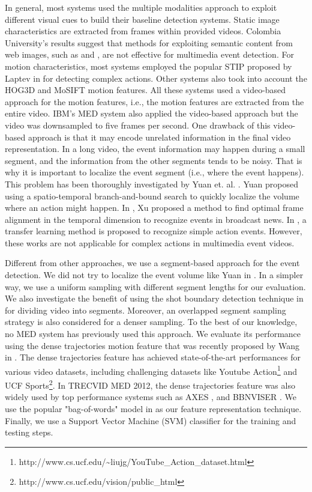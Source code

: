 In general, most systems used the multiple modalities approach to exploit different visual cues to build their baseline detection systems. Static image characteristics are extracted from frames within provided videos. Colombia University's results \cite{trecvid10:cuucf} suggest that methods for exploiting semantic content from web images, such as \cite{duan2012exploiting} and \cite{trecvid10:cuucf}, are not effective for multimedia event detection. For motion characteristics, most systems employed the popular STIP proposed by Laptev in \cite{Laptev:2005:SIP} for detecting complex actions. Other systems also took into account the HOG3D \cite{Klaser08BMVC} and MoSIFT \cite{Chen_mosift} motion features. All these systems used a video-based approach for the motion features, i.e., the motion features are extracted from the entire video. IBM's MED system \cite{trecvid10:IBM} also applied the video-based approach but the video was downsampled to five frames per second. One drawback of this video-based approach is that it may encode unrelated information in the final video representation. In a long video, the event information may happen during a small segment, and the information from the other segments tends to be noisy. That is why it is important to localize the event segment (i.e., where the event happens). This problem has been thoroughly investigated by Yuan et. al. \cite{Yuan2011PAMI}. Yuan proposed using a spatio-temporal branch-and-bound search to quickly localize the volume where an action might happen. In \cite{xu2008video}, Xu proposed a method to find optimal frame alignment in the
temporal dimension to recognize events in broadcast news. In \cite{duan2012visual}, a transfer learning method is proposed to recognize simple action events. However, these works are not applicable for complex actions in multimedia event videos.

Different from other approaches, we use a segment-based approach for the event detection. We did not try to localize the event volume like Yuan in \cite{Yuan2011PAMI}. In a simpler way, we use a uniform sampling with different segment lengths for our evaluation. We also investigate the benefit of using the shot boundary detection technique in \cite{Guimaraes:2003} for dividing video into segments. Moreover, an overlapped segment sampling strategy is also considered for a denser sampling. To the best of our knowledge, no MED system has previously used this approach. We evaluate its performance using the dense trajectories motion feature that was recently proposed by Wang in \cite{wang:2011:inria-00583818:1}. The dense trajectories feature has achieved state-of-the-art performances for various video datasets, including challenging datasets like Youtube Action\footnote{http://www.cs.ucf.edu/{\textasciitilde}liujg/YouTube\_Action\_dataset.html} and UCF Sports\footnote{http://www.cs.ucf.edu/vision/public\_html}. In TRECVID MED 2012, the dense trajectories feature was also widely used by top performance systems such as AXES \cite{oneata:hal-00746874}, and BBNVISER \cite{NIST-TRECVID12:BBN-DVMM}. We use the popular "bag-of-words" model in \cite{csurka2004visual} as our feature representation technique. Finally, we use a Support Vector Machine (SVM) classifier for the training and testing steps. 

